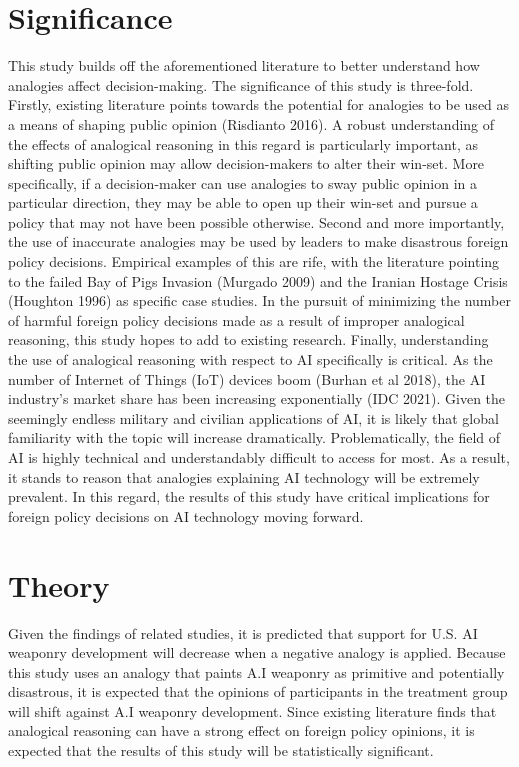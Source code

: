 \documentclass[12pt]{article}
\begin{document}
\section {Significance}
This study builds off the aforementioned literature to better understand how analogies affect decision-making. The significance of this study is three-fold. Firstly, existing literature points towards the potential for analogies to be used as a means of shaping public opinion (Risdianto 2016). A robust understanding of the effects of analogical reasoning in this regard is particularly important, as shifting public opinion may allow decision-makers to alter their win-set. More specifically, if a decision-maker can use analogies to sway public opinion in a particular direction, they may be able to open up their win-set and pursue a policy that may not have been possible otherwise. 
\bigbreak
Second and more importantly, the use of inaccurate analogies may be used by leaders to make disastrous foreign policy decisions. Empirical examples of this are rife, with the literature pointing to the failed Bay of Pigs Invasion (Murgado 2009) and the Iranian Hostage Crisis (Houghton 1996) as specific case studies. In the pursuit of minimizing the number of harmful foreign policy decisions made as a result of improper analogical reasoning, this study hopes to add to existing research.
\bigbreak
Finally, understanding the use of analogical reasoning with respect to AI specifically is critical. As the number of Internet of Things (IoT) devices boom (Burhan et al 2018), the AI industry’s market share has been increasing exponentially (IDC 2021). Given the seemingly endless military and civilian applications of AI, it is likely that global familiarity with the topic will increase dramatically. Problematically, the field of AI is highly technical and understandably difficult to access for most. As a result, it stands to reason that analogies explaining AI technology will be extremely prevalent. In this regard, the results of this study have critical implications for foreign policy decisions on AI technology moving forward.
\section {Theory}
Given the findings of related studies, it is predicted that support for U.S. AI weaponry development will decrease when a negative analogy is applied. Because this study uses an analogy that paints A.I weaponry as primitive and potentially disastrous, it is expected that the opinions of participants in the treatment group will shift against A.I weaponry development. Since existing literature finds that analogical reasoning can have a strong effect on foreign policy opinions, it is expected that the results of this study will be statistically significant.
\end{document}
